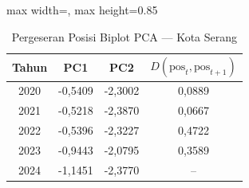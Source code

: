 \begin{table}[H]
\centering
\caption{Pergeseran Posisi Biplot PCA --- Kota Serang} \label{tab:appjarak_pca_skor_kota_serang}
\begin{adjustbox}{max width=\textwidth, max height=0.85\textheight}
\begin{tabular}{|c|c|c|c|}
\hline
\textbf{Tahun} & \textbf{PC1} & \textbf{PC2} & \textbf{$D(\text{pos}_t, \text{pos}_{t+1})$} \\
\hline
2020 & -0,5409 & -2,3002 & 0,0889 \\
2021 & -0,5218 & -2,3870 & 0,0667 \\
2022 & -0,5396 & -2,3227 & 0,4722 \\
2023 & -0,9443 & -2,0795 & 0,3589 \\
2024 & -1,1451 & -2,3770 & -- \\
\hline
\end{tabular}
\end{adjustbox}
\end{table}